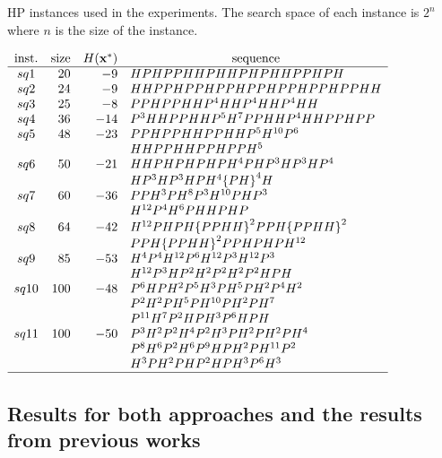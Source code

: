 \begin{table}[htbp]
	\begin{center}
		\caption{HP instances used in the experiments. The search space of each instance is $2^n$ where $n$ is the size of
			the instance.}
		\label{tab:instances}
		{$\begin{array}{c r r l}
			\text{inst.} & \text{size} &  \multicolumn{1}{ c }{H({\bf{x}}^*)} & \multicolumn{1}{c}{\text{sequence}} \\ \hline
			sq1 &20 &-9 & HPHPPHHPHHPHPHHPPHPH \\
			sq2 &24 &-9 & HHPPHPPHPPHPPHPPHPPHPPHH \\
			sq3 &25 &-8 & PPHPPHHP^4HHP^4HHP^4HH \\
			sq4 &36 &-14 &  P^3HHPPHHP^5H^7PPHHP^4HHPPHPP\\
			sq5 &48 &-23 &  PPHPPHHPPHHP^5H^{10}P^6 \\
			&   &    &  HHPPHHPPHPPH^5 \\
			sq6 &50 &-21 &  HHPHPHPHPH^4PHP^3HP^3HP^4 \\
			&   &    & HP^3HP^3HPH^4{\{PH\}}^4H\\
			sq7 &60 &-36 &  PPH^3PH^8P^3H^{10}PHP^3\\
			&   &    &  H^{12}P^4H^6PHHPHP\\
			sq8 &64 &-42 &   H^{12}PHPH{\{PPHH\}}^2PPH{\{PPHH\}}^2\\
			&   &    &  PPH{\{PPHH\}}^2PPHPHPH^{12}\\
			sq9  &85   &-53  & H^4P^4H^{12}P^6 H^{12} P^3 H^{12} P^3 \\
			&   &    &    H^{12} P^3  H P^2 H^2    P^2 H^2  P^2 H P H  \\
			sq10  &100  &-48  &  P^6HPH^{2}P^5H^{3}PH^5PH^{2} P^4 H^{2} \\
			&   &    &   P^2  H^2 P  H^5  P H^{10} P H^{2} P H^{7}  \\
			&   &    &  P^{11} H^{7} P^2  H P   H^3  P^{6} H P H \\
			sq11 &100  &-50  &  P^3H^{2}P^2H^{4}P^2H^{3}PH^{2} PH^{2}PH^{4} \\
			&   &    & P^8 H^6 P^{2} H^{6} P^{9} H P H^{2} P  H^{11} P^2  \\
			&   &    &H^3 P  H^{2} P H P^2  H P H^3 P^6 H^3\\ \hline
			\end{array}$}
	\end{center}
\end{table}

\subsection{Results for both approaches and the results from previous works}

